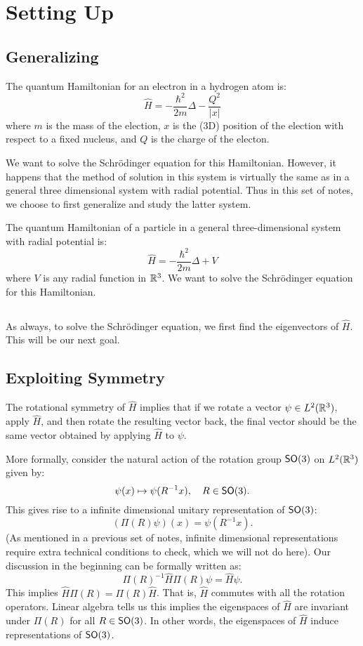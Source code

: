 \section{Setting Up}

\subsection{Generalizing}
The quantum Hamiltonian for an electron in a hydrogen atom is:
\[
    \hat{H} = - \frac{\hbar^2}{2m}\Delta - \frac{Q^2}{|x|}
\]
where $m$ is the mass of the election, $x$ is the (3D) position of the election with respect to a fixed nucleus, and $Q$ is the charge of the electon.

We want to solve the Schr\"{o}dinger equation for this Hamiltonian. However, it happens that the method of solution in this system is virtually the same as in a general three dimensional system with radial potential. Thus in this set of notes, we choose to first generalize and study the latter system.

The quantum Hamiltonian of a particle in a general three-dimensional system with radial potential is:
\[
    \hat{H} = - \frac{\hbar^2}{2m}\Delta + V
\]
where $V$ is any radial function in ${\mathbb R}^3$. We want to solve the Schr\"{o}dinger equation for this Hamiltonian.

\subsection{}
As always, to solve the Schr\"{o}dinger equation, we first find the eigenvectors of $\hat{H}$. This will be our next goal.

\subsection{Exploiting Symmetry}
The rotational symmetry of $\hat{H}$ implies that if we rotate a vector $\psi \in L^2({\mathbb R}^3)$, apply $\hat{H}$, and then rotate the resulting vector back, the final vector should be the same vector obtained by applying $\hat{H}$ to $\psi$.

More formally, consider the natural action of the rotation group $\operatorname{\textsf{SO}}(3)$ on $L^2({\mathbb R}^3)$ given by:
\[
    \psi(x) \mapsto \psi(R^{-1}x), \quad R \in \operatorname{\textsf{SO}}(3).
\]
This gives rise to a infinite dimensional unitary representation of $\operatorname{\textsf{SO}}(3)$:
\[
    (\Pi(R)\psi)(x) = \psi(R^{-1}x).
\]
(As mentioned in a previous set of notes, infinite dimensional representations require extra technical conditions to check, which we will not do here). Our discussion in the beginning can be formally written as:
\[
    \Pi(R)^{-1}\hat{H}\Pi(R)\psi = \hat{H}\psi.
\]
This implies $\hat{H}\Pi(R) = \Pi(R)\hat{H}$. That is, $\hat{H}$ commutes with all the rotation operators. Linear algebra tells us this implies the eigenspaces of $\hat{H}$ are invariant under $\Pi(R)$ for all $R \in \operatorname{\textsf{SO}}(3)$. In other words, the eigenspaces of $\hat{H}$ induce representations of $\operatorname{\textsf{SO}}(3)$.

